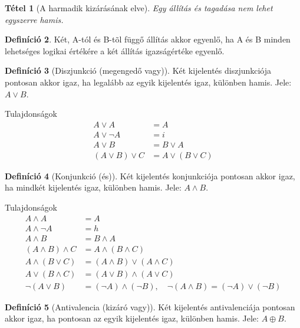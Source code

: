 \documentclass[twoside,12pt]{report}
\newtheorem{theorem}{Tétel}[section]
\theoremstyle{definition}
\newtheorem{definition}[theorem]{Definíció}
\begin{document}
	\begin{theorem}[A harmadik kizárásának elve]
		Egy állítás és tagadása nem lehet egyszerre hamis.
	\end{theorem}
	\begin{definition}
		Két, A-tól és B-tõl függő állítás akkor egyenlő, ha A és B minden lehetséges logikai
		értékére a két állítás igazságértéke egyenlő.
	\end{definition}
	\begin{definition}[Diszjunkció (megengedő vagy)]
		Két kijelentés diszjunkciója pontosan akkor igaz, ha legalább az egyik kijelentés igaz, különben hamis. Jele: $A \vee B$.
	\end{definition}
	\begin{outline}
		\1 Tulajdonságok
			\2[] 
			\begin{align*}
				A\vee A&=A\\
				A\vee \neg A&=i\\
				A\vee B&=B\vee A\tag{Kommutatív}\\
				(A\vee B)\vee C&=A\vee(B\vee C)\tag{Asszociatív}
			\end{align*}
	\end{outline}
	\begin{definition}[Konjunkció (és)]
		Két kijelentés konjunkciója pontosan akkor igaz, ha mindkét kijelentés igaz, különben hamis. Jele: $A\wedge B$.
	\end{definition}
	\begin{outline}
		\1 Tulajdonságok
			\2[] 
			\begin{align*}
				A\wedge A&=A\\
				A\wedge \neg A&=h\\
				A\wedge B&=B\wedge A\tag{Kommutatív}\\
				(A\wedge B)\wedge C&=A\wedge(B\wedge C)\tag{Asszociatív}\\
				A\wedge(B\vee C)&=(A\wedge B)\vee(A\wedge C)\tag{Diszjunkcióra nézve disztributív}\\
				A\vee(B\wedge C)&=(A\vee B)\wedge(A\vee C)\tag{Konjunkcióra nézve disztributív}\\
				\neg(A\vee B)&=(\neg A)\wedge(\neg B),\quad \neg(A\wedge B)=(\neg A)\vee(\neg B)\tag{De Morgan azonosságok}
			\end{align*}
	\end{outline}
	\begin{definition}[Antivalencia (kizáró vagy)]
		Két kijelentés antivalenciája pontosan akkor igaz, ha pontosan az egyik kijelentés igaz, különben hamis. Jele: $A\oplus B$.
	\end{definition}
\end{document}
